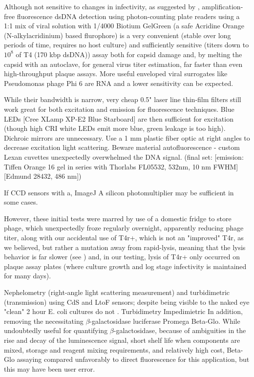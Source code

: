 \documentclass[paper.tex]{subfiles}
\begin{document}
Although not sensitive to changes in infectivity, as suggested by \cite{Quantification2020}, amplification-free fluorescence dsDNA detection using photon-counting plate readers using a 1:1 mix of viral solution with 1/4000 Biotium GelGreen (a safe Acridine Orange (N-alkylacridinium) based flurophore) is a very convenient (stable over long periods of time, requires no host culture) and sufficiently sensitive (titers down to $10^8$ of T4 (170 kbp dsDNA)) assay both for capsid damage and, by melting the capsid with an autoclave, for general virus titer estimation, far faster than even high-throughput plaque assays. More useful enveloped viral surrogates like Pseudomonas phage Phi 6 are RNA and a lower sensitivity can be expected. 

While their bandwidth is narrow, very cheap 0.5" laser line thin-film filters still work great for both excitation and emission for fluorescence techniques. Blue LEDs [Cree XLamp XP-E2 Blue Starboard] are then sufficient for excitation (though high CRI white LEDs emit more blue, green leakage is too high). Dichroic mirrors are unnecessary. Use a 1 mm plastic fiber optic at right angles to decrease excitation light scattering. Beware material autofluorescence - custom Lexan cuvettes unexpectedly overwhelmed the DNA signal. (final set: [emission: Tiffen Orange 16 gel in series with Thorlabs FL05532, 532nm, 10 nm FWHM] [Edmund 28432, 486 nm])

If CCD sensors with a, ImageJ \cite{Image2012} A silicon photomultiplier may be sufficient in some cases.

However, these initial tests were marred by use of a domestic fridge to store phage, which unexpectedly froze regularly overnight, apparently reducing phage titer, along with our accidental use of T4r+, which is not an "improved" T4r, as we believed, but rather a mutation away from rapid-lysis, meaning that the lysis behavior is far slower (see \cite{Spontaneous1946}) and, in our testing, lysis of T4r+ only occurred on plaque assay plates (where culture growth and log stage infectivity is maintained for many days). 

Nephelometry (right-angle light scattering measurement) and turbidimetric (transmission) using CdS and LtoF sensors; despite being visible to the naked eye "clean" 2 hour E. coli cultures do not .  Turbidimetry Impedimietric In addition, removing the necessitating 
$\beta$-galactosidase luciferase Promega Beta-Glo\cite{rapid2014}. While undoubtedly useful for quantifying $\beta$-galactosidase, because of ambiguities in the rise and decay of the luminescence signal, short shelf life when components are mixed, storage and reagent mixing requirements, and relatively high cost, Beta-Glo assaying compared unfavorably to direct fluorescence for this application, but this may have been user error.
\end{document}
